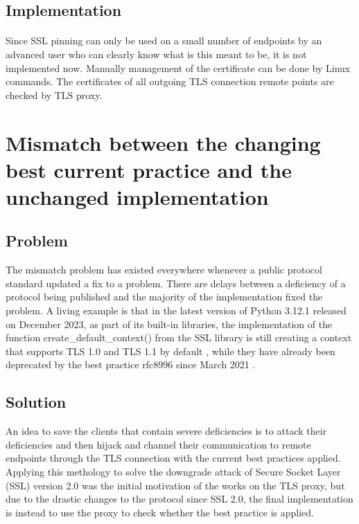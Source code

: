 \documentclass[mscthesis]{usiinfthesis}
\begin{document}
\subsection{Implementation}
\paragraph{}
Since SSL pinning can only be used on a small number of endpoints by an advanced user who can clearly know what is this meant to be, it is not implemented now. Manually management of the certificate can be done by Linux commands. The certificates of all outgoing TLS connection remote points are checked by TLS proxy.

\section{Mismatch between the changing best current practice and the unchanged implementation}
\subsection{Problem}
The mismatch problem has existed everywhere whenever a public protocol standard updated a fix to a problem. There are delays between a deficiency of a protocol being published and the majority of the implementation fixed the problem. A living example is that in the latest version of Python 3.12.1 released on December 2023, as part of its built-in libraries, the implementation of the function create\_default\_context() from the SSL library is still creating a context that supports TLS 1.0 and TLS 1.1 by default \citep{pyton:ssl}, while they have already been deprecated by the best practice rfc8996 since March 2021 \citep{rfc:notls11}.

\subsection{Solution}
An idea to save the clients that contain severe deficiencies is to attack their deficiencies and then hijack and channel their communication to remote endpoints through the TLS connection with the current best practices applied. Applying this methology to solve the downgrade attack of Secure Socket Layer (SSL) version 2.0 was the initial motivation of the works on the TLS proxy, but due to the drastic changes to the protocol since SSL 2.0, the final implementation is instead to use the proxy to check whether the best practice is applied.
\end{document}
